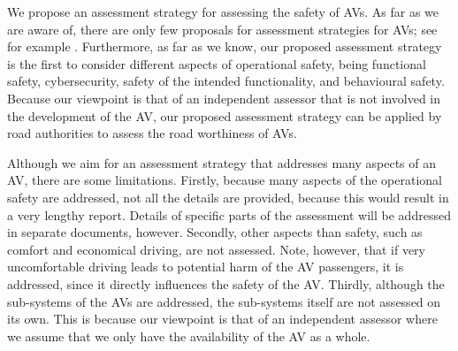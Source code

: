 We propose an assessment strategy for assessing the safety of AVs. As far as we are aware of, there are only few proposals for assessment strategies for AVs; see for example \cite{nhtsa2018framework, zhou2019methodology}. Furthermore, as far as we know, our proposed assessment strategy is the first to consider different aspects of operational safety, being functional safety, cybersecurity, safety of the intended functionality, and behavioural safety. Because our viewpoint is that of an independent assessor that is not involved in the development of the AV, our proposed assessment strategy can be applied by road authorities to assess the road worthiness of AVs.

Although we aim for an assessment strategy that addresses many aspects of an AV, there are some limitations. Firstly, because many aspects of the operational safety are addressed, not all the details are provided, because this would result in a very lengthy report. Details of specific parts of the assessment will be addressed in separate documents, however. Secondly, other aspects than safety, such as comfort and economical driving, are not assessed. Note, however, that if very uncomfortable driving leads to potential harm of the AV passengers, it is addressed, since it directly influences the safety of the AV. Thirdly, although the sub-systems of the AVs are addressed, the sub-systems itself are not assessed on its own. This is because our viewpoint is that of an independent assessor where we assume that we only have the availability of the AV as a whole.

